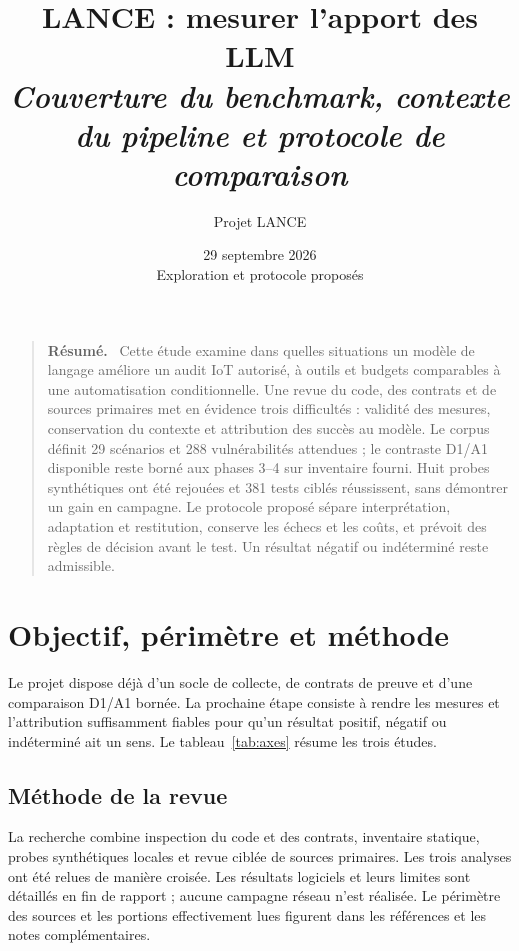 \documentclass[11pt,a4paper]{article}
\title{\bfseries LANCE : mesurer l'apport des LLM\\[0.5em]\large\mdseries\itshape Couverture du benchmark, contexte du pipeline et protocole de comparaison}
\author{Projet LANCE}
\date{29 septembre 2026\\[0.4em]\small Exploration et protocole proposés}
\renewenvironment{abstract}
  {\begin{quote}\small\noindent\textbf{Résumé.}\ }
  {\par\end{quote}}
\begin{document}
\maketitle
\begin{abstract}
Cette étude examine dans quelles situations un modèle de langage améliore un audit IoT autorisé, à outils et budgets comparables à une automatisation conditionnelle. Une revue du code, des contrats et de sources primaires met en évidence trois difficultés : validité des mesures, conservation du contexte et attribution des succès au modèle. Le corpus définit 29 scénarios et 288 vulnérabilités attendues ; le contraste D1/A1 disponible reste borné aux phases 3--4 sur inventaire fourni. Huit probes synthétiques ont été rejouées et 381 tests ciblés réussissent, sans démontrer un gain en campagne. Le protocole proposé sépare interprétation, adaptation et restitution, conserve les échecs et les coûts, et prévoit des règles de décision avant le test. Un résultat négatif ou indéterminé reste admissible.
\end{abstract}
\clearpage

\begingroup
\small
\tableofcontents
\endgroup
\clearpage

\section{Objectif, périmètre et méthode}
Le projet dispose déjà d'un socle de collecte, de contrats de preuve et d'une
comparaison D1/A1 bornée. La prochaine étape consiste à rendre les mesures et
l'attribution suffisamment fiables pour qu'un résultat positif, négatif ou
indéterminé ait un sens. Le tableau~\ref{tab:axes} résume les trois études.

\subsection{Méthode de la revue}
La recherche combine inspection du code et des contrats, inventaire statique,
probes synthétiques locales et revue ciblée de sources primaires. Les trois
analyses ont été relues de manière croisée. Les résultats logiciels et leurs
limites sont détaillés en fin de rapport ; aucune campagne réseau n'est réalisée.
Le périmètre des sources et les portions effectivement lues figurent dans les
références et les notes complémentaires.
\end{document}
